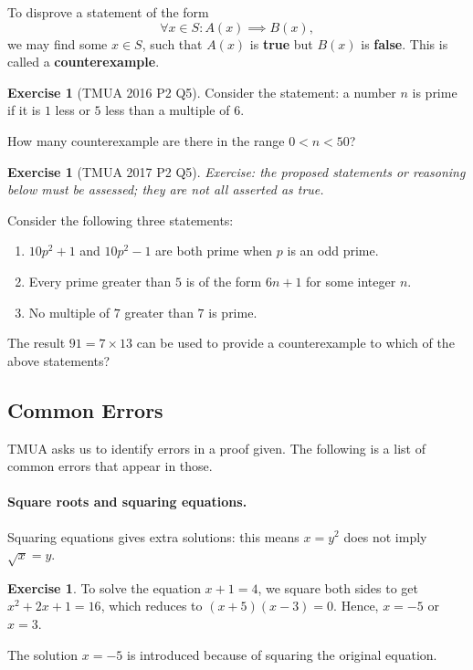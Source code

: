 \documentclass[11pt]{article}
\theoremstyle{definition}
\newtheorem{example}[theorem]{Exercise}
\theoremstyle{remark}
\newcommand{\pqty}[1]{\left(#1\right)}
\begin{document}
To disprove a statement of the form
\[
    \forall x \in S: A\pqty{x} \implies B\pqty{x},
\]
we may find some \(x \in S\), such that \(A\pqty{x}\) is \textbf{true} but \(B\pqty{x}\) is \textbf{false}. This is called a \textbf{counterexample}.

\begin{example}[TMUA 2016 P2 Q5]\label{tmua-6-unit-022}
    Consider the statement: a number \(n\) is prime if it is \(1\) less or \(5\) less than a multiple of \(6\).

    How many counterexample are there in the range \(0 < n < 50\)?
\end{example}

\begin{example}[TMUA 2017 P2 Q5]\label{tmua-6-unit-023}
\textit{Exercise: the proposed statements or reasoning below must be assessed; they are not all asserted as true.}\par

    Consider the following three statements:
    \begin{enumerate}[label=\Roman*.]
        \item \(10 p^2 + 1\) and \(10 p^2 - 1\) are both prime when \(p\) is an odd prime.
        \item Every prime greater than \(5\) is of the form \(6n + 1\) for some integer \(n\).
        \item No multiple of \(7\) greater than \(7\) is prime.
    \end{enumerate}

    The result \(91 = 7 \times 13\) can be used to provide a counterexample to which of the above statements?
\end{example}

\subsection{Common Errors}\label{tmua-6-subsection-012}

TMUA asks us to identify errors in a proof given. The following is a list of common errors that appear in those.

\paragraph{Square roots and squaring equations.} Squaring equations gives extra solutions: this means \(x = y^2\) does not imply \(\sqrt{x} = y\).

\begin{example}\label{tmua-6-unit-024}
    To solve the equation \(x + 1 = 4\), we square both sides to get \(x^2 + 2x + 1 = 16\), which reduces to \(\pqty{x + 5} \pqty{x - 3} = 0\). Hence, \(x = -5\) or \(x = 3\).

    The solution \(x = -5\) is introduced because of squaring the original equation.
\end{example}
\end{document}
